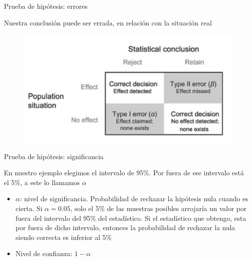 \documentclass{beamer}
\begin{document}
\begin{frame}{Prueba de hipótesis: errores}

Nuestra conclusión puede ser errada, en relación con la situación real

\begin{figure}
\centering
        \includegraphics[scale=0.8]{error.PNG}
        
        \end{figure}
    
\end{frame}

\begin{frame}{Prueba de hipótesis: significancia}

En nuestro ejemplo elegimos el intervalo de 95\%. Por fuera de ese intervalo está el 5\%, a este lo llamamos $\alpha$
\begin{itemize}
    \item $\alpha$: nivel de significancia. Probabilidad de rechazar la hipótesis nula cuando es cierta. Si $\alpha=0.05$, solo el 5\% de las muestras posibles arrojaría un valor por fuera del intervalo del 95\% del estadístico. Si el estadístico que obtengo, esta por fuera de dicho intervalo, entonces la probabilidad de rechazar la nula siendo correcta es inferior al 5\%
    \item Nivel de confianza: $1-\alpha$
\end{itemize}
    
\end{frame}
\end{document}
